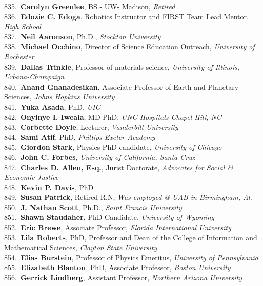835.~{\bf Carolyn Greenlee}, BS - UW- Madison, {\sl Retired} \\
836.~{\bf Edozie C. Edoga}, Robotics Instructor and FIRST Team Lead Mentor, {\sl High School} \\
837.~{\bf Neil Aaronson}, Ph.D., {\sl Stockton University} \\
838.~{\bf Michael Occhino}, Director of Science Education Outreach, {\sl University of Rochester} \\
839.~{\bf Dallas Trinkle}, Professor of materials science, {\sl University of Illinois, Urbana-Champaign } \\
840.~{\bf Anand Gnanadesikan}, Associate Professor of Earth and Planetary Sciences, {\sl Johns Hopkins University} \\
841.~{\bf Yuka Asada}, PhD, {\sl UIC} \\
842.~{\bf Onyinye I. Iweala}, MD PhD, {\sl UNC Hospitals Chapel Hill, NC} \\
843.~{\bf Corbette Doyle}, Lecturer, {\sl Vanderbilt University} \\
844.~{\bf Sami Atif}, PhD, {\sl Phillips Exeter Academy } \\
845.~{\bf Giordon Stark}, Physics PhD candidate, {\sl University of Chicago} \\
846.~{\bf John C. Forbes}, {\sl University of California, Santa Cruz} \\
847.~{\bf Charles D. Allen, Esq.}, Jurist Doctorate, {\sl Advocates for Social \& Economic Justice} \\
848.~{\bf Kevin P. Davis}, PhD \\
849.~{\bf Susan Patrick}, Retired R.N, {\sl Was employed @ UAB in Birmingham, Al.} \\
850.~{\bf J. Nathan Scott}, Ph.D., {\sl Saint Francis University} \\
851.~{\bf Shawn Staudaher}, PhD Candidate, {\sl University of Wyoming} \\
852.~{\bf Eric Brewe}, Associate Professor, {\sl Florida International University} \\
853.~{\bf Lila Roberts}, PhD, Professor and Dean of the College of Information and Mathematical Sciences, {\sl Clayton State University} \\
854.~{\bf Elias Burstein}, Professor of  Physics Emeritus, {\sl University of Pennsylvania} \\
855.~{\bf Elizabeth Blanton}, PhD, Associate Professor, {\sl Boston University} \\
856.~{\bf Gerrick Lindberg}, Assistant Professor, {\sl Northern Arizona University} \\
